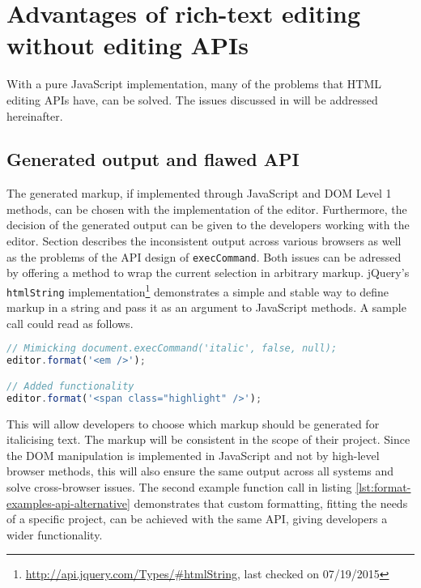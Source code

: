 
\section{Advantages of rich-text editing without editing APIs}

With a pure JavaScript implementation, many of the problems that HTML editing APIs have, can be solved. The issues discussed in  will be addressed hereinafter.

\subsection{Generated output and flawed API} 
\label{subsec:adv_flawed_api}


The generated markup, if implemented through JavaScript and DOM Level 1 methods, can be chosen with the implementation of the editor. Furthermore, the decision of the generated output can be given to the developers working with the editor. Section  describes the inconsistent output across various browsers as well as the problems of the API design of \texttt{execCommand}. Both issues can be adressed by offering a method to wrap the current selection in arbitrary markup. jQuery's \texttt{htmlString} implementation\footnote{\url{http://api.jquery.com/Types/\#htmlString}, last checked on 07/19/2015} demonstrates a simple and stable way to define markup in a string and pass it as an argument to JavaScript methods. A sample call could read as follows.

\begin{lstlisting}[language=JavaScript, caption=Example calls to format text, label=lst:format-examples-api-alternative]
// Mimicking document.execCommand('italic', false, null);
editor.format('<em />');

// Added functionality
editor.format('<span class="highlight" />');
\end{lstlisting}

This will allow developers to choose which markup should be generated for italicising text. The markup will be consistent in the scope of their project. Since the DOM manipulation is implemented in JavaScript and not by high-level browser methods, this will also ensure the same output across all systems and solve cross-browser issues. The second example function call in listing \ref{lst:format-examples-api-alternative} demonstrates that custom formatting, fitting the needs of a specific project, can be achieved with the same API, giving developers a wider functionality.

